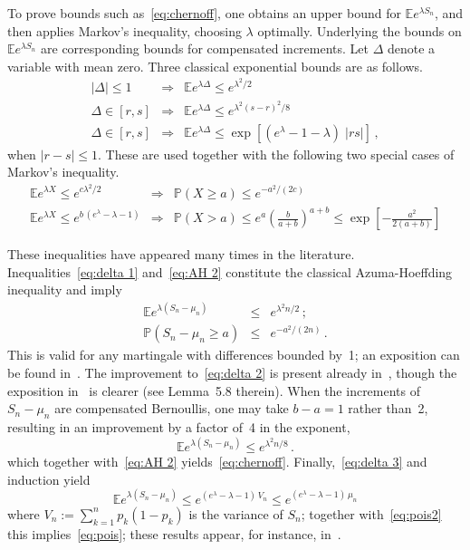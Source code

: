 \documentclass[10pt]{article}
\theoremstyle{plain}
\theoremstyle{remark}
\def\E{{\mathbb E}}
\def\P{{\mathbb P}}
\def\mean{\mu}
\begin{document}
To prove bounds such as~\eqref{eq:chernoff}, one obtains
an upper bound for $\E e^{\lambda S_n}$, and then applies
Markov's inequality, choosing $\lambda$ optimally.  Underlying
the bounds on $\E e^{\lambda S_n}$ are corresponding bounds
for compensated increments.  Let $\Delta$ denote a variable
with mean zero.  Three classical exponential bounds are as
follows.
%
\begin{eqnarray}
|\Delta| \leq 1 & \Rightarrow &
   \E e^{\lambda \Delta} \leq e^{\lambda^2 / 2}
   \label{eq:delta 1} \\[1ex]
\Delta \in [r,s] & \Rightarrow &
   \E e^{\lambda \Delta} \leq e^{\lambda^2 (s-r)^2 / 8}
   \label{eq:delta 2} \\[1ex]
\Delta \in [r,s] & \Rightarrow &
\E e^{\lambda \Delta}
   \leq \exp \left [ (e^\lambda - 1 - \lambda) \; |rs| \right ] \, ,
   \label{eq:delta 3}
\end{eqnarray}
when $|r-s| \leq 1$.
These are used together with the following two special cases
of Markov's inequality.
\begin{eqnarray}
\E e^{\lambda X} \leq e^{c \lambda^2 / 2} & \Longrightarrow
   & \P (X \geq a) \leq e^{-a^2 / (2c)}
   \label{eq:AH 2} \\[1ex]
\E e^{\lambda X} \leq e^{b \, (e^\lambda - \lambda - 1)}
   & \Longrightarrow &
   \P (X > a) \leq e^a \left ( \frac{b}{a+b} \right )^{a+b}
   \leq \exp \left [ - \frac{a^2}{2 (a+b)} \right ]
   \label{eq:pois2}
\end{eqnarray}

These inequalities have appeared many times in the literature.
Inequalities~\eqref{eq:delta 1} and~\eqref{eq:AH 2} constitute
the classical Azuma-Hoeffding inequality and imply
\begin{eqnarray}
\E e^{\lambda (S_n - \mean_n)} & \leq & e^{\lambda^2 n / 2}
   \, ; \label{eq:AH 1} \\[1ex]
\P (S_n - \mean_n \geq a) & \leq & e^{-a^2 / (2n)} \, .  \label{eq:AH 3}
\end{eqnarray}
This is valid for any martingale with differences bounded by~1;
an exposition can be found in~\cite[Theorem~7.2.1]{alon-spencer}.
%
The improvement to~\eqref{eq:delta 2} is present already
in~\cite{hoeffding}, though the exposition in~\cite{mcdiarmid89}
is clearer (see Lemma~5.8 therein).  When the increments of
$S_n - \mean_n$ are compensated Bernoullis, one may take $b-a = 1$
rather than~2, resulting in an improvement by a factor of~4
in the exponent,
\begin{equation} \label{eq:quadratic}
\E e^{\lambda (S_n - \mean_n)} \leq e^{\lambda^2 n / 8} \, .
\end{equation}
which together with~\eqref{eq:AH 2} yields~\eqref{eq:chernoff}.
%
Finally,~\eqref{eq:delta 3} and induction yield
\begin{equation} \label{eq:exp pois}
\E e^{\lambda (S_n - \mean_n)} \leq e^{(e^\lambda - \lambda - 1) \, V_n}
   \leq e^{(e^\lambda - \lambda - 1) \, \mean_n}
\end{equation}
where $V_n := \sum_{k=1}^n p_k (1 - p_k)$ is the variance of $S_n$;
together with~\eqref{eq:pois2} this implies~\eqref{eq:pois};
these results appear, for instance, in~\cite[(1.3)--(1.6)]{freedman75}.
\end{document}
